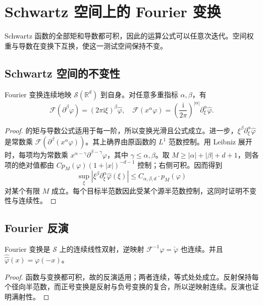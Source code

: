 \section{Schwartz 空间上的 Fourier 变换}
\label{b2:sec:0502}

Schwartz 函数的全部矩和导数都可积，因此的运算公式可以任意次迭代。空间权重与导数在变换下互换，使这一测试空间保持不变。

\subsection{Schwartz 空间的不变性}
\label{b2:subsec:050201}

\begin{theorem}\label{b2:thm:05-schwartz-invariance}
Fourier 变换连续地映 \(\mathcal S(\mathbb R^d)\) 到自身。对任意多重指标 \(\alpha,\beta\)，有
\[
 \mathcal F(\partial^\beta\varphi)=(2\pi\mathrm{i}\xi)^\beta\widehat\varphi,
 \quad
 \mathcal F(x^\alpha\varphi)=\left(\dfrac{\mathrm{i}}{2\pi}\right)^{|\alpha|}\partial_\xi^\alpha\widehat\varphi.
\]
\end{theorem}
\begin{proof}
的矩与导数公式适用于每一阶，所以变换光滑且公式成立。进一步，\(\xi^\beta\partial_\xi^\alpha\widehat\varphi\) 是常数乘 \(\mathcal F(\partial^\beta(x^\alpha\varphi))\)。其上确界由原函数的 \(L^1\) 范数控制。用 Leibniz 展开时，每项均为常数乘 \(x^{\alpha-\gamma}\partial^{\beta-\gamma}\varphi\)，其中 \(\gamma\leq\alpha,\beta\)。取 \(M\geq|\alpha|+|\beta|+d+1\)，则各项的绝对值都由 \(C p_M(\varphi)(1+|x|)^{-d-1}\) 控制；右侧可积。因而得到
\[
 \sup_\xi|\xi^\beta\partial_\xi^\alpha\widehat\varphi(\xi)|
 \leq C_{\alpha,\beta,d}\cdot p_M(\varphi)
\]
对某个有限 \(M\) 成立。每个目标半范数因此受某个源半范数控制，这同时证明不变性与连续性。
\end{proof}

\subsection{Fourier 反演}
\label{b2:subsec:050202}

\begin{corollary}\label{b2:cor:05-schwartz-automorphism}
Fourier 变换是 \(\mathcal S\) 上的连续线性双射，逆映射 \(\mathcal F^{-1}\varphi=\check\varphi\) 也连续。并且 \(\widehat{\widehat\varphi}(x)=\varphi(-x)\)。
\end{corollary}
\begin{proof}
函数与变换都可积，故的反演适用；两者连续，等式处处成立。反射保持每个径向半范数，而正号变换是反射与负号变换的复合，所以逆映射连续。反演也证明满射性。
\end{proof}

